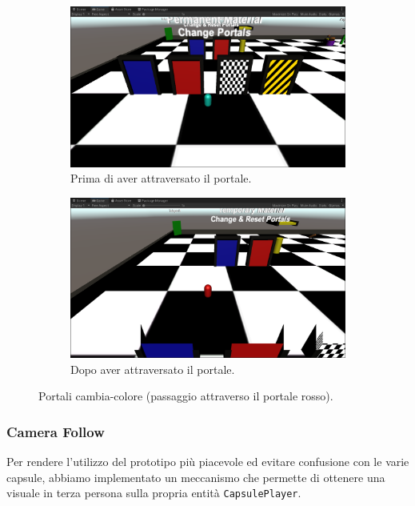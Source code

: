 \begin{figure}[!ht]
    \begin{subfigure}{.49\textwidth}
      \centering
      \includegraphics[width=.95\linewidth]{gfx/imgs/chapter4/PortaleCambiaColore1.png}
      \caption{Prima di aver attraversato il portale.}
      \label{fig:portale-colore-1}
    \end{subfigure}
    \begin{subfigure}{.49\textwidth}
      \centering
      \includegraphics[width=.95\linewidth]{gfx/imgs/chapter4/PortaleCambiaColore2.png}
      \caption{Dopo aver attraversato il portale.}
      \label{fig:portale-colore-2}
    \end{subfigure}
    \caption{Portali cambia-colore (passaggio attraverso il portale rosso).}
    \label{fig:portali-cambia-colore}
\end{figure}

\subsubsection{Camera Follow}
Per rendere l'utilizzo del prototipo più piacevole ed evitare confusione con le varie capsule, abbiamo implementato un meccanismo che permette di ottenere una visuale in terza persona sulla propria entità \verb|CapsulePlayer|.

